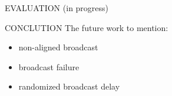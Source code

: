 \documentclass[10pt, conference, letterpaper]{IEEEtran}
\begin{document}
    \begin{section}{EVALUATION}
        \label{sec:evaluation}
        (in progress)
    \end{section}

    \begin{section}{CONCLUTION}
        \label{sec:conclusion}
        The future work to mention:
        \begin{itemize}
            \item non-aligned broadcast
            \item broadcast failure
            \item randomized broadcast delay
        \end{itemize}
    \end{section}

    
    
\end{document}
